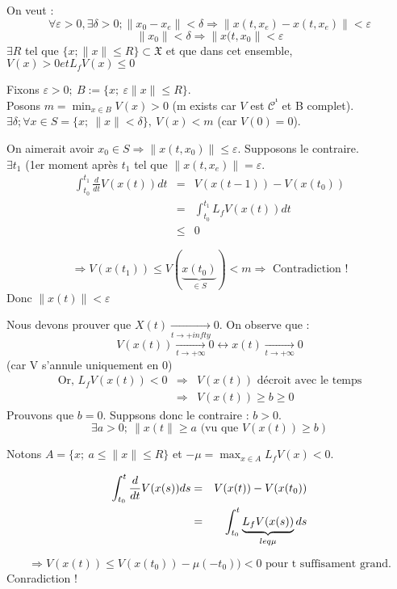 \begin{dem}
	On veut :
	\[\forall \varepsilon >0, \exists \delta>0; \|x_0-x_e\|<\delta \Rightarrow \|x(t,x_e)-x(t,x_e)\|<\varepsilon\]
	\[\|x_0\|<\delta \Rightarrow \|x(t,x_0\|<\varepsilon\]
	$\exists R$ tel que $\{x; \|x\|\leq R\}\subset \mathfrak{X}$ et que dans cet ensemble, $V(x)>0 et L_f V(x)\leq 0$

	\bigskip
	Fixons $\varepsilon>0;\ B:=\{x;\ \varepsilon\|x\|\leq R\}$. \\
	Posons $m=\min_{x\in B} V(x)>0$ (m exists car $V$ est $\mathcal{C}^¹$ et B complet). \\
	$\exists \delta; \forall x\in S=\{x;\ \|x\|<\delta\},\ V(x)<m$ (car $V(0)=0$).

	\bigskip
	On aimerait avoir $x_0\in S \Rightarrow \|x(t,x_0)\|\leq \varepsilon$. Supposons le contraire.\\
	$\exists t_1$ (1er moment après $t_1$ tel que $\|x(t,x_e)\|=\varepsilon$. 
	\begin{eqnarray*}
		\int_{t_0}^{t_1} \frac{d}{dt} V(x(t)) dt &=& V(x(t-1))-V(x(t_0))\\
							&=& \int_{t_0}^{t_1} L_f V(x(t)) dt \\
		     					&\leq& 0
	\end{eqnarray*}
	
	\[\Rightarrow V(x(t_1))\leq V(\underbrace{x(t_0)}_{\in S}) <m \Rightarrow \text{ Contradiction !}\]
	Donc $\|x(t)\| < \varepsilon$
\end{dem}


\begin{dem}
	Nous devons prouver que $X(t)\xrightarrow[t\to +infty]{} 0$. On observe que :
	\[V(x(t))\xrightarrow[t\to +\infty]{} 0 \leftrightarrow x(t)\xrightarrow[t\to +\infty]{}0\]
	(car V s'annule uniquement en 0)\\
	\begin{eqnarray*}
		\text{Or, } L_f V(x(t))<0  &\Rightarrow& V(x(t)) \text{ décroit avec le temps}\\
					&\Rightarrow& V(x(t)) \geq b \geq 0
	\end{eqnarray*}
	Prouvons que $b=0$. Suppsons donc le contraire : $b>0$. 
	\[\exists a>0;\ \|x(t\|\geq a \text{ (vu que }V(x(t))\geq b)\]

	Notons $A=\{x;\ a\leq \|x\| \leq R\}$ et $-\mu = \max_{x\in A} L_f V(x) <0$.

	\begin{eqnarray*}
		\int_{t_0}^t \frac{d}{dt} V(x(s)) ds &=& V(x(t))-V(x(t_0)) \\
						&=& \int_{t_0}^t \underbrace{L_f V(x(s))}_{leq \-\mu} ds
	\end{eqnarray*}

	\[\Rightarrow V(x(t))\leq V(x(t_0)) - \mu(-t_0))<0 \text{ pour t suffisament grand.}\]
	Conradiction !
\end{dem}
